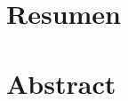 \documentclass[\main/main.tex]{subfiles}
\begin{document}
\chapter{Resumen}
	

	
\chapter{Abstract}	

	
\end{document}
